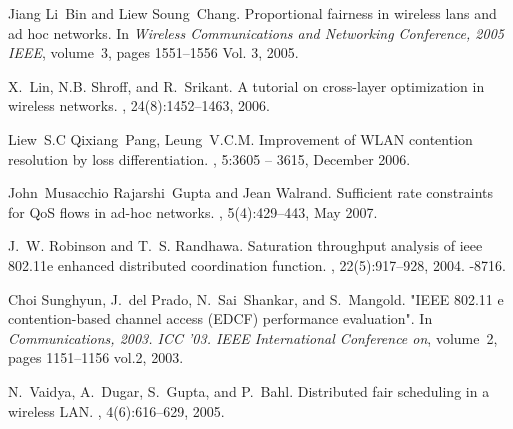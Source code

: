 \documentclass[letterpaper, 10 pt, conference]{ieeeconf}
\begin{document}
\begin{thebibliography}{10}
Jiang Li~Bin and Liew Soung~Chang.
\newblock Proportional fairness in wireless lans and ad hoc networks.
\newblock In {\em Wireless Communications and Networking Conference, 2005
  IEEE}, volume~3, pages 1551--1556 Vol. 3, 2005.

X.~Lin, N.B. Shroff, and R.~Srikant.
\newblock A tutorial on cross-layer optimization in wireless networks.
,
  24(8):1452--1463, 2006.

Liew~S.C Qixiang~Pang, Leung~V.C.M.
\newblock Improvement of {WLAN} contention resolution by loss differentiation.
, 5:3605 -- 3615,
  December 2006.

John~Musacchio Rajarshi~Gupta and Jean Walrand.
\newblock Sufficient rate constraints for {QoS} flows in ad-hoc networks.
, 5(4):429--443, May 2007.

J.~W. Robinson and T.~S. Randhawa.
\newblock Saturation throughput analysis of ieee 802.11e enhanced distributed
  coordination function.
,
  22(5):917--928, 2004.
-8716.

Choi Sunghyun, J.~del Prado, N.~Sai~Shankar, and S.~Mangold.
\newblock "{IEEE} 802.11 e contention-based channel access ({EDCF}) performance
  evaluation".
\newblock In {\em Communications, 2003. ICC '03. IEEE International Conference
  on}, volume~2, pages 1151--1156 vol.2, 2003.

N.~Vaidya, A.~Dugar, S.~Gupta, and P.~Bahl.
\newblock Distributed fair scheduling in a wireless {LAN}.
, 4(6):616--629, 2005.

\end{thebibliography}
\end{document}
